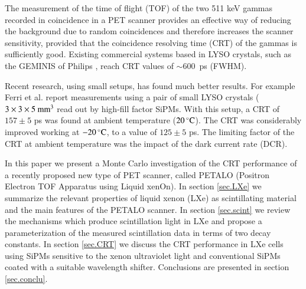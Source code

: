\documentclass[review]{elsarticle}
\begin{document}
The measurement of the time of flight (TOF) of the two 511 keV gammas recorded in coincidence in a PET scanner provides an effective way of reducing the background due to random coincidences and therefore increases the scanner sensitivity, provided that the coincidence resolving time (CRT) of the gammas is sufficiently good. Existing commercial systems based in LYSO crystals, such as the GEMINIS of Philips \cite{gemini}, reach CRT values of $\sim 600$~ps (FWHM). 

Recent research, using small setups, has found much better results. For example Ferri et al. \cite{LysoFBK} report measurements using a pair of small LYSO crystals 
($3 \times 3 \times 5 {\rm\ mm^3}$ read out by high-fill factor SiPMs. With this setup, a CRT of $157\pm 5$ ps was found at ambient temperature ($20\,^{\circ}{\rm C}$). The CRT was considerably improved working at $-20\,^{\circ}{\rm C}$, to a value of
 $125\pm 5$ ps. The limiting factor of the CRT at ambient temperature was the impact of the dark current rate (DCR).

In this paper we present a Monte Carlo investigation of the CRT performance of a recently proposed new type of
PET scanner, called PETALO (Positron Electron TOF Apparatus using Liquid xenOn). 
 In section \ref{sec.LXe} we summarize the relevant properties of liquid xenon (LXe) as scintillating material and the main features of the PETALO scanner. In section \ref{sec.scint} we review the mechanisms which produce scintillation light in LXe and propose a parameterization of the measured scintillation data in terms of two decay constants. In section \ref{sec.CRT} we discuss the CRT performance in LXe cells using SiPMs sensitive to the xenon ultraviolet  light and conventional SiPMs coated with a suitable wavelength shifter. Conclusions are presented in section \ref{sec.conclu}. 

%
\end{document}
